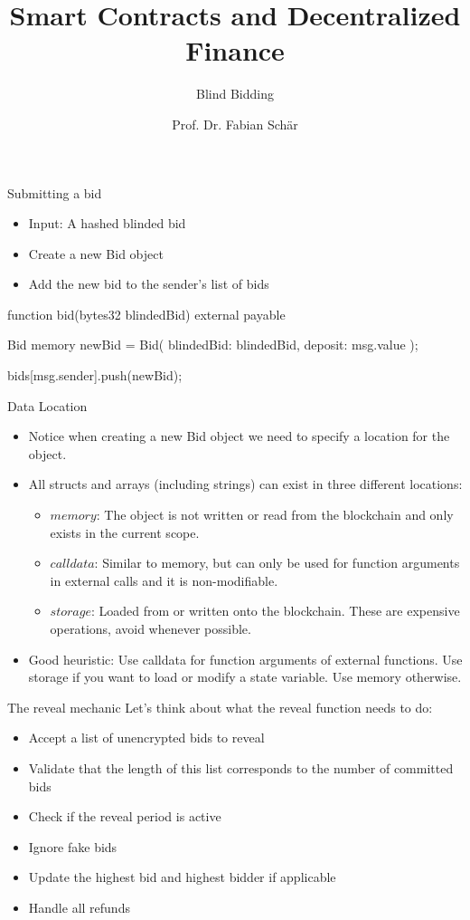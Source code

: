 \documentclass[]{beamer}
\title{Smart Contracts and Decentralized Finance}
\subtitle{Blind Bidding}
\author{Prof. Dr. Fabian Schär}
\institute{University of Basel}
\begin{document}
\thispagestyle{empty}
\begin{frame}[noframenumbering]
	\titlepage
\end{frame}

\begin{frame}{Submitting a bid}

	\begin{itemize}
		\item Input: A hashed blinded bid
		\item Create a new Bid object
		\item Add the new bid to the sender's list of bids
	\end{itemize}
	
	function bid(bytes32 blindedBid) external payable {
  		Bid memory newBid = Bid({
    	blindedBid: blindedBid,
    	deposit: msg.value
  	});

  		bids[msg.sender].push(newBid);
	}

\end{frame}

\begin{frame}{Data Location}
	\begin{itemize}
		\item Notice when creating a new Bid object we need to specify a location for the object.
		\item All structs and arrays (including strings) can exist in three different locations:
		\begin{itemize}
			\item $memory$: The object is not written or read from the blockchain and only exists in the current scope.
			\item $calldata$: Similar to memory, but can only be used for function arguments in external calls and it is non-modifiable.
			\item $storage$: Loaded from or written onto the blockchain. These are expensive operations, avoid whenever possible.
		\end{itemize}		
		\item Good heuristic: Use calldata for function arguments of external functions. Use storage if you want to load or modify a state variable. Use memory otherwise.
	\end{itemize}

\end{frame}

\begin{frame}{The reveal mechanic}
	Let's think about what the reveal function needs to do:
	\begin{itemize}
		\item Accept a list of unencrypted bids to reveal
		\item Validate that the length of this list corresponds to the number of committed bids
		\item Check if the reveal period is active
		\item Ignore fake bids
		\item Update the highest bid and highest bidder if applicable
		\item Handle all refunds
	\end{itemize}

\end{frame}
\end{document}
